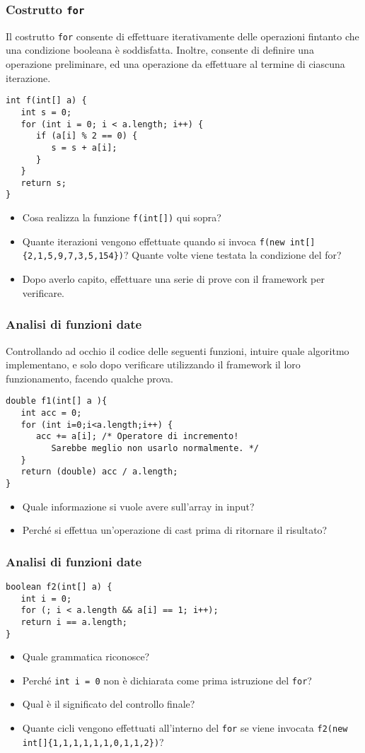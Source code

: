 \documentclass{beamer}
\begin{document}
\begin{frame}[fragile]
\frametitle{Costrutto \texttt{for}}
Il costrutto \texttt{for} consente di effettuare iterativamente delle operazioni fintanto che una condizione booleana è soddisfatta. Inoltre, consente di definire una operazione preliminare, ed una operazione da effettuare al termine di ciascuna iterazione.
\scriptsize
\begin{verbatim}
int f(int[] a) {
   int s = 0;
   for (int i = 0; i < a.length; i++) {
      if (a[i] % 2 == 0) {
         s = s + a[i];
      }
   }
   return s;
}
\end{verbatim}
\normalsize
\begin{itemize}
 \item Cosa realizza la funzione \texttt{f(int[])} qui sopra?
 \item Quante iterazioni vengono effettuate quando si invoca \texttt{f(new int[]\{2,1,5,9,7,3,5,154\})}? Quante volte viene testata la condizione del for?
 \item Dopo averlo capito, effettuare una serie di prove con il framework per verificare. 
\end{itemize}
\end{frame}

\begin{frame}[fragile]
\frametitle{Analisi di funzioni date}
Controllando ad occhio il codice delle seguenti funzioni, intuire quale algoritmo implementano, e solo dopo verificare utilizzando il framework il loro funzionamento, facendo qualche prova.
\begin{verbatim}
double f1(int[] a ){
   int acc = 0;
   for (int i=0;i<a.length;i++) {
      acc += a[i]; /* Operatore di incremento!
         Sarebbe meglio non usarlo normalmente. */
   }
   return (double) acc / a.length;
}
\end{verbatim}
\begin{itemize}
 \item Quale informazione si vuole avere sull'array in input?
 \item Perché si effettua un'operazione di cast prima di ritornare il risultato?
\end{itemize}
\end{frame}

\begin{frame}[fragile]
\frametitle{Analisi di funzioni date}
\begin{verbatim}
boolean f2(int[] a) {
   int i = 0;
   for (; i < a.length && a[i] == 1; i++);
   return i == a.length;
}
\end{verbatim}
\begin{itemize}
 \item Quale grammatica riconosce?
 \item Perché \texttt{int i = 0} non è dichiarata come prima istruzione del \texttt{for}?
 \item Qual è il significato del controllo finale?
 \item Quante cicli vengono effettuati all'interno del \texttt{for} se viene invocata \texttt{f2(new int[]\{1,1,1,1,1,1,0,1,1,2\})}?
\end{itemize}
\end{frame}
\end{document}
